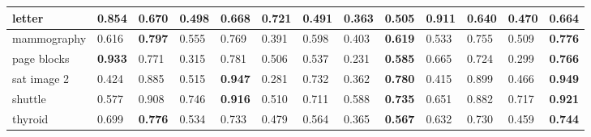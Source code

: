\begin{table}[]
{\begin{tabular}{|l|llll|llllllll|}
letter            & \multicolumn{1}{l|}{\textbf{0.854}} & \multicolumn{1}{l|}{0.670}          & \multicolumn{1}{l|}{0.498}  & 0.668          & \multicolumn{1}{l|}{\textbf{0.721}} & \multicolumn{1}{l|}{0.491}          & \multicolumn{1}{l|}{0.363}  & \multicolumn{1}{l|}{0.505}          & \multicolumn{1}{l|}{\textbf{0.911}} & \multicolumn{1}{l|}{0.640}          & \multicolumn{1}{l|}{0.470}  & 0.664          \\ \hline
mammography       & \multicolumn{1}{l|}{0.616}          & \multicolumn{1}{l|}{\textbf{0.797}} & \multicolumn{1}{l|}{0.555}  & 0.769          & \multicolumn{1}{l|}{0.391}          & \multicolumn{1}{l|}{0.598}          & \multicolumn{1}{l|}{0.403}  & \multicolumn{1}{l|}{\textbf{0.619}} & \multicolumn{1}{l|}{0.533}          & \multicolumn{1}{l|}{0.755}          & \multicolumn{1}{l|}{0.509}  & \textbf{0.776} \\ \hline
page blocks       & \multicolumn{1}{l|}{\textbf{0.933}} & \multicolumn{1}{l|}{0.771}          & \multicolumn{1}{l|}{0.315}  & 0.781          & \multicolumn{1}{l|}{0.506}          & \multicolumn{1}{l|}{0.537}          & \multicolumn{1}{l|}{0.231}  & \multicolumn{1}{l|}{\textbf{0.585}} & \multicolumn{1}{l|}{0.665}          & \multicolumn{1}{l|}{0.724}          & \multicolumn{1}{l|}{0.299}  & \textbf{0.766} \\ \hline
sat image 2       & \multicolumn{1}{l|}{0.424}          & \multicolumn{1}{l|}{0.885}          & \multicolumn{1}{l|}{0.515}  & \textbf{0.947} & \multicolumn{1}{l|}{0.281}          & \multicolumn{1}{l|}{0.732}          & \multicolumn{1}{l|}{0.362}  & \multicolumn{1}{l|}{\textbf{0.780}} & \multicolumn{1}{l|}{0.415}          & \multicolumn{1}{l|}{0.899}          & \multicolumn{1}{l|}{0.466}  & \textbf{0.949} \\ \hline
shuttle           & \multicolumn{1}{l|}{0.577}          & \multicolumn{1}{l|}{0.908}          & \multicolumn{1}{l|}{0.746}  & \textbf{0.916} & \multicolumn{1}{l|}{0.510}          & \multicolumn{1}{l|}{0.711}          & \multicolumn{1}{l|}{0.588}  & \multicolumn{1}{l|}{\textbf{0.735}} & \multicolumn{1}{l|}{0.651}          & \multicolumn{1}{l|}{0.882}          & \multicolumn{1}{l|}{0.717}  & \textbf{0.921} \\ \hline
thyroid           & \multicolumn{1}{l|}{0.699}          & \multicolumn{1}{l|}{\textbf{0.776}} & \multicolumn{1}{l|}{0.534}  & 0.733          & \multicolumn{1}{l|}{0.479}          & \multicolumn{1}{l|}{0.564}          & \multicolumn{1}{l|}{0.365}  & \multicolumn{1}{l|}{\textbf{0.567}} & \multicolumn{1}{l|}{0.632}          & \multicolumn{1}{l|}{0.730}          & \multicolumn{1}{l|}{0.459}  & \textbf{0.744} \\ \hline

\end{tabular}}
\end{table}
